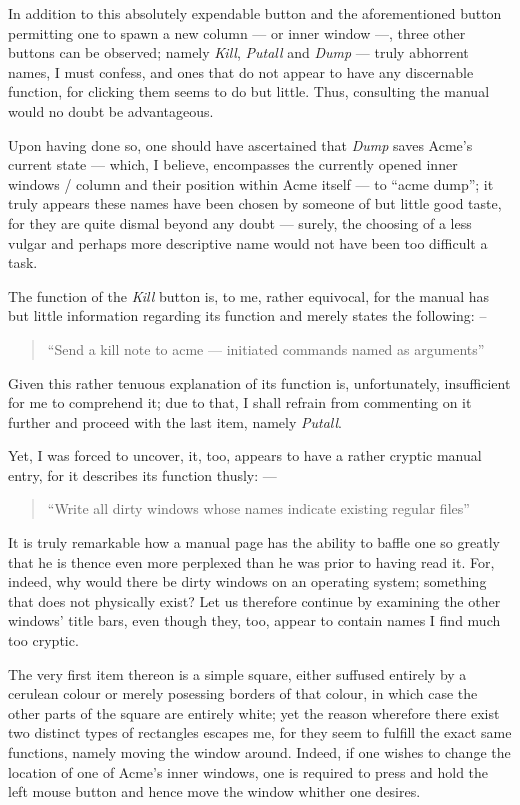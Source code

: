 \documentclass[a5paper,twoside,12pt]{report}
\begin{document}
    In addition to this absolutely expendable button and the aforementioned button permitting one to spawn a new column — or inner window —, three other buttons can be observed; namely \textit{Kill}, \textit{Putall} and \textit{Dump} — truly abhorrent names, I must confess, and ones that do not appear to have any discernable function, for clicking them seems to do but little. Thus, consulting the manual would no doubt be advantageous. 

    Upon having done so, one should have ascertained that \textit{Dump} saves Acme's current state — which, I believe, encompasses the currently opened inner windows / column and their position within Acme itself — to ``acme dump''; it truly appears these names have been chosen by someone of but little good taste, for they are quite dismal beyond any doubt — surely, the choosing of a less vulgar and perhaps more descriptive name would not have been too difficult a task.

    The function of the \textit{Kill} button is, to me, rather equivocal, for the manual has but little information regarding its function and merely states the following: –

    \begin{quote}
      ``Send a kill note to acme — initiated commands named as arguments''
    \end{quote}

    Given this rather tenuous explanation of its function is, unfortunately, insufficient for me to comprehend it; due to that, I shall refrain from commenting on it further and proceed with the last item, namely \textit{Putall}.

    Yet, I was forced to uncover, it, too, appears to have a rather cryptic manual entry, for it describes its function thusly: —

    \begin{quote}
      ``Write all dirty windows whose names indicate existing regular files''
    \end{quote}

    It is truly remarkable how a manual page has the ability to baffle one so greatly that he is thence even more perplexed than he was prior to having read it. For, indeed, why would there be dirty windows on an operating system; something that does not physically exist? Let us therefore continue by examining the other windows' title bars, even though they, too, appear to contain names I find much too cryptic.

    The very first item thereon is a simple square, either suffused entirely by a cerulean colour or merely posessing borders of that colour, in which case the other parts of the square are entirely white; yet the reason wherefore there exist two distinct types of rectangles escapes me, for they seem to fulfill the exact same functions, namely moving the window around. Indeed, if one wishes to change the location of one of Acme's inner windows, one is required to press and hold the left mouse button and hence move the window whither one desires. 
\end{document}
